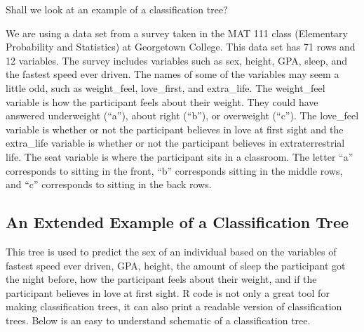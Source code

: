 \documentclass[12pt,twoside]{reedthesis}
\begin{document}
  Shall we look at an example of a classification tree?
  
  We are using a data set from a survey taken in the MAT 111 class
  (Elementary Probability and Statistics) at Georgetown College. This data
  set has 71 rows and 12 variables. The survey includes variables such as
  sex, height, GPA, sleep, and the fastest speed ever driven. The names of
  some of the variables may seem a little odd, such as weight\_feel,
  love\_first, and extra\_life. The weight\_feel variable is how the
  participant feels about their weight. They could have answered
  underweight (``a''), about right (``b''), or overweight (``c''). The
  love\_feel variable is whether or not the participant believes in love
  at first sight and the extra\_life variable is whether or not the
  participant believes in extraterrestrial life. The seat variable is
  where the participant sits in a classroom. The letter ``a'' corresponds
  to sitting in the front, ``b'' corresponds sitting in the middle rows,
  and ``c'' corresponds to sitting in the back rows.
  
  \subsection{An Extended Example of a Classification
  Tree}\label{an-extended-example-of-a-classification-tree}
  
  This tree is used to predict the sex of an individual based on the
  variables of fastest speed ever driven, GPA, height, the amount of sleep
  the participant got the night before, how the participant feels about
  their weight, and if the participant believes in love at first sight. R
  code is not only a great tool for making classification trees, it can
  also print a readable version of classification trees. Below is an easy
  to understand schematic of a classification tree.
  
\end{document}
